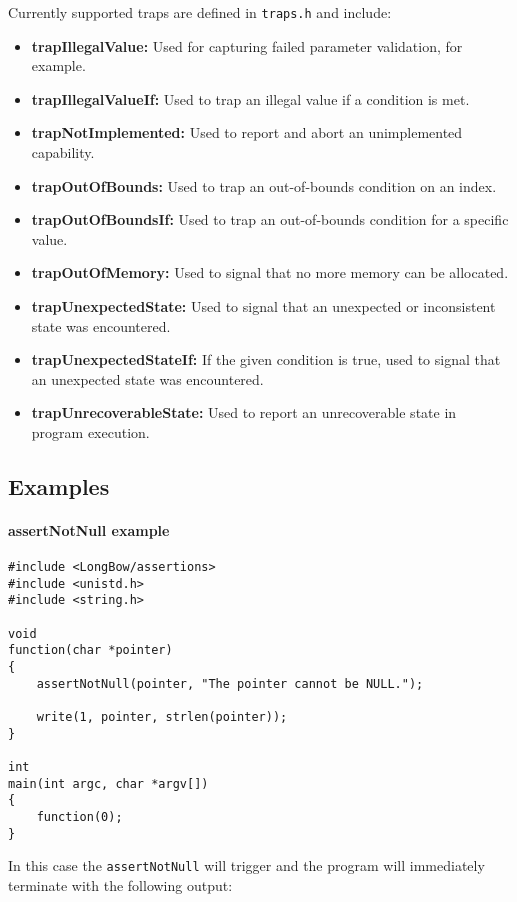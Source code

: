 \noindent Currently supported traps are defined in \texttt{traps.h} and include:
\begin{itemize}
\item  \textbf{trapIllegalValue:} Used for capturing failed parameter validation, for example.
\item  \textbf{trapIllegalValueIf:} Used to trap an illegal value if a condition is met.
\item  \textbf{trapNotImplemented:} Used to report and abort an unimplemented capability.
\item  \textbf{trapOutOfBounds:}  Used to trap an out-of-bounds condition on an index.
\item  \textbf{trapOutOfBoundsIf:} Used to trap an out-of-bounds condition for a specific value.
\item  \textbf{trapOutOfMemory:} Used to signal that no more memory can be allocated.
\item  \textbf{trapUnexpectedState:} Used to signal that an unexpected or inconsistent state was encountered.
\item  \textbf{trapUnexpectedStateIf:} If the given condition is true, used to signal that an unexpected state was encountered.
\item  \textbf{trapUnrecoverableState:} Used to report an unrecoverable state in program execution.
\end{itemize}

\subsection{Examples }  

\paragraph {assertNotNull example}

\begin{lstlisting}
#include <LongBow/assertions>
#include <unistd.h>
#include <string.h>

void
function(char *pointer)
{
    assertNotNull(pointer, "The pointer cannot be NULL.");

    write(1, pointer, strlen(pointer));
}

int
main(int argc, char *argv[])
{
    function(0);
}
\end{lstlisting}


In this case the {\tt assertNotNull} will trigger and the program will immediately terminate with the following output:

